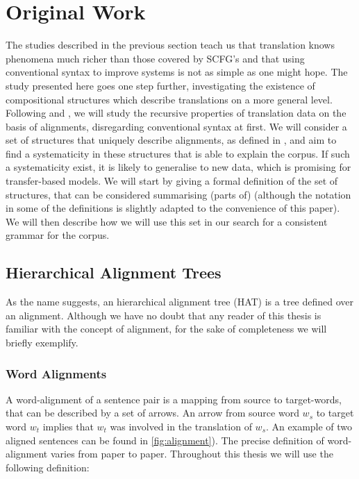 \documentclass[a4paper, 11pt]{report}
\theoremstyle{definition}
\theoremstyle{plain}
\begin{document}
\section{Original Work}

The studies described in the previous section teach us that translation knows phenomena much richer than those covered by SCFG's and that using conventional syntax to improve systems is not as simple as one might hope. The study presented here goes one step further, investigating the existence of compositional structures which describe translations on a more general level. Following \cite{wu1997stochastic} and \cite{wellington2006empirical}, we will study the recursive properties of translation data on the basis of alignments, disregarding conventional syntax at first.  We will consider a set of structures that uniquely describe alignments, as defined in \cite{simaan2013hats}, and aim to find a systematicity in these structures that is able to explain the corpus. If such a systematicity exist, it is likely to generalise to new data, which is promising for transfer-based models. We will start by giving a formal definition of the set of structures, that can be considered summarising (parts of) \cite{simaan2013hats} (although the notation in some of the definitions is slightly adapted to the convenience of this paper). We will then describe how we will use this set in our search for a consistent grammar for the corpus.


\subsection{Hierarchical Alignment Trees}

As the name suggests, an hierarchical alignment tree (HAT) is a tree defined over an alignment. Although we have no doubt that any reader of this thesis is familiar with the concept of alignment, for the sake of completeness we will briefly exemplify.

\subsubsection{Word Alignments} A word-alignment of a sentence pair is a mapping from source to target-words, that can be described by a set of arrows. An arrow from source word $w_s$ to target word $w_t$ implies that $w_t$ was involved in the translation of $w_s$. An example of two aligned sentences can be found in \ref{fig:alignment}). The precise definition of word-alignment varies from paper to paper. Throughout this thesis we will use the following definition:
\end{document}
